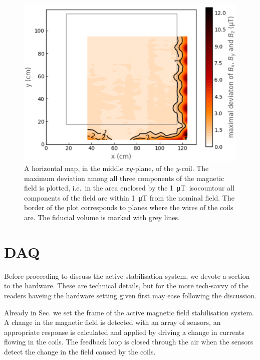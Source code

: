 \begin{figure}
  \centering
  \includegraphics[width=0.9\linewidth]{gfx/prototype/plane_map.png}
  \caption{A horizontal map, in the middle $xy$-plane, of the $y$-coil. The maximum deviation among all three components of the magnetic field is plotted, i.e.\ in the area enclosed by the \SI{1}{\micro\tesla}~isocountour all components of the field are within \SI{1}{\micro\tesla} from the nominal field. The border of the plot corresponds to planes where the wires of the coils are. The fiducial volume is marked with grey lines.}
  \label{fig:prototype_plane_map}
\end{figure}



\section{DAQ}
Before proceeding to discuss the active stabilisation system, we devote a section to the hardware. These are technical details, but for the more tech-savvy of the readers haveing the hardware setting given first may ease following the discussion.

Already in Sec.  we set the frame of the active magnetic field stabilisation system. A change in the magnetic field is detected with an array of sensors, an appropriate response is calculated and applied by driving a change in currents flowing in the coils. The feedback loop is closed through the air when the sensors detect the change in the field caused by the coils.


